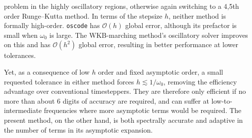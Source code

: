 \documentclass[10pt]{article}
\newcommand{\bigO}{{\mathcal O}}
\newcommand{\om}{\omega}
\newcommand{\g}{\gamma}
\newcommand{\AB}[1]{{\color{orange}#1}}
\begin{document}
problem in the highly oscillatory regions,
otherwise again switching to a 4,5th order Runge--Kutta method.
%
In terms of the stepsize $h$, neither method is formally high-order.
\texttt{oscode} has
$\bigO(h)$ global error, although
its prefactor is small when $\om_0$ is large.
The
WKB-marching method's oscillatory solver improves on this and has $\bigO(h^2)$ global error, resulting in better performance at lower tolerances.

Yet, as a consequence of low $h$ order and fixed asymptotic order,
a small requested tolerance in either method forces
$h \lesssim 1/\om_0$, removing the efficiency advantage over conventional timesteppers.
They are therefore only efficient if no more than about 6 digits of accuracy
are required, and can suffer at low-to-intermediate frequencies where more asymptotic terms would be required.
The present method, on the other hand, is both spectrally accurate and 
adaptive in the number of terms in its asymptotic expansion.

\end{document}
